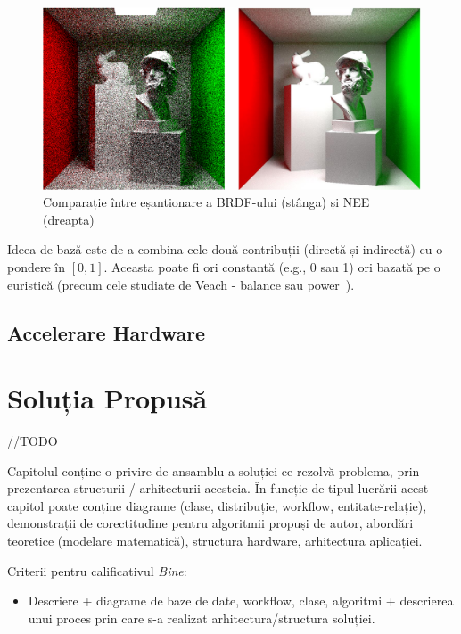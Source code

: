 \documentclass[12pt,a4paper]{report}
\numberwithin{equation}{section} %
\begin{document}
\begin{figure}[ht]
	\centering
	\includegraphics[width=\textwidth]{pics/nee.png}
	\caption{Comparație între eșantionare a BRDF-ului (stânga) și NEE (dreapta)\protect\footnotemark}
	\label{fig:nee}
\end{figure}

Ideea de bază este de a combina cele două contribuții (directă și indirectă)
cu o pondere în $[0, 1]$. Aceasta poate fi ori constantă (e.g., 0 sau 1) ori
bazată pe o euristică (precum cele studiate de Veach - balance sau power~\cite{Veach,VeachPower}).

\section{Accelerare Hardware}

\chapter{\label{sec:solutie}Soluția Propusă}

//TODO

Capitolul conține o privire de ansamblu a soluției ce rezolvă problema, prin prezentarea structurii / arhitecturii acesteia. În funcție de tipul lucrării acest capitol poate conține diagrame (clase, distribuție, workflow, entitate-relație), demonstrații de corectitudine pentru algoritmii propuși de autor, abordări teoretice (modelare matematică), structura hardware, arhitectura aplicației.

Criterii pentru calificativul \textit{Bine}:
\begin{itemize}
	\item 	Descriere + diagrame de baze de date, workflow, clase, algoritmi + descrierea unui proces prin care s-a realizat arhitectura/structura soluției.
\end{itemize}
\end{document}
